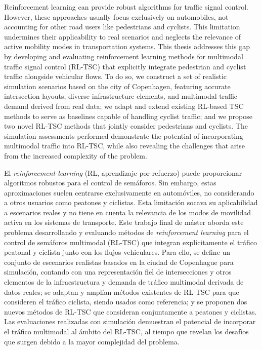 

\vspace{1cm}

Reinforcement learning can provide robust algorithms for traffic signal control. However, these approaches usually focus exclusively on automobiles, not accounting for other road users like pedestrians and cyclists. This limitation undermines their applicability to real scenarios and neglects the relevance of active mobility modes in transportation systems. This thesis addresses this gap by developing and evaluating reinforcement learning methods for multimodal traffic signal control (RL-TSC) that explicitly integrate pedestrian and cyclist traffic alongside vehicular flows. To do so, we construct a set of realistic simulation scenarios based on the city of Copenhagen, featuring accurate intersection layouts, diverse infrastructure elements, and multimodal traffic demand derived from real data; we adapt and extend existing RL-based TSC methods to serve as baselines capable of handling cyclist traffic; and we propose two novel RL-TSC methods that jointly consider pedestrians and cyclists. The simulation assessments performed demonstrate the potential of incorporating multimodal traffic into RL-TSC, while also revealing the challenges that arise from the increased complexity of the problem.

\vspace{2cm}


\vspace{1cm}

El \textit{reinforcement learning} (RL, aprendizaje por refuerzo) puede proporcionar algoritmos robustos para el control de semáforos. Sin embargo, estas aproximaciones suelen centrarse exclusivamente en automóviles, no considerando a otros usuarios como peatones y ciclistas. Esta limitación socava su aplicabilidad a escenarios reales y no tiene en cuenta la relevancia de los modos de movilidad activa en los sistemas de transporte. Este trabajo final de máster aborda este problema desarrollando y evaluando métodos de \textit{reinforcement learning} para el control de semáforos multimodal (RL-TSC) que integran explícitamente el tráfico peatonal y ciclista junto con los flujos vehiculares. Para ello, se define un conjunto de escenarios realistas basados en la ciudad de Copenhague para simulación, contando con una representación fiel de intersecciones y otros elementos de la infraestructura y demanda de tráfico multimodal derivada de datos reales; se adaptan y amplían métodos existentes de RL-TSC para que consideren el tráfico ciclista, siendo usados como referencia; y se proponen dos nuevos métodos de RL-TSC que consideran conjuntamente a peatones y ciclistas. Las evaluaciones realizadas con simulación demuestran el potencial de incorporar el tráfico multimodal al ámbito del RL-TSC, al tiempo que revelan los desafíos que surgen debido a la mayor complejidad del problema.


